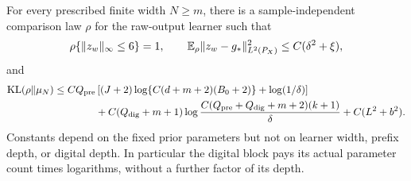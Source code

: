 \begin{lemma}
\label{lem:raw-bit-comparison}
For every prescribed finite width $N\ge m$, there is a
sample-independent comparison law $\rho$ for the raw-output learner
such that
\[
 \rho\{\|z_w\|_\infty\le6\}=1,\qquad
 \mathbb E_\rho\|z_w-g_*\|_{L^2(P_X)}^2
       \le C(\delta^2+\xi),
\]
and
\begin{align}
 \operatorname{KL}(\rho\Vert\mu_N)\le C Q_{\rm pre}
 &\left[(J+2)\log\{C(d+m+2)(B_0+2)\}
                   +\log(1/\delta)\right]\notag\\
 &+C(Q_{\rm dig}+m+1)
       \log\frac{C(Q_{\rm pre}+Q_{\rm dig}+m+2)(k+1)}{\delta}
       +C(L^2+b^2).
 \label{eq:raw-bit-resource}
\end{align}
Constants depend on the fixed prior parameters but not on learner
width, prefix depth, or digital depth. In particular the digital
block pays its actual parameter count times logarithms, without
a further factor of its depth.
\end{lemma}
